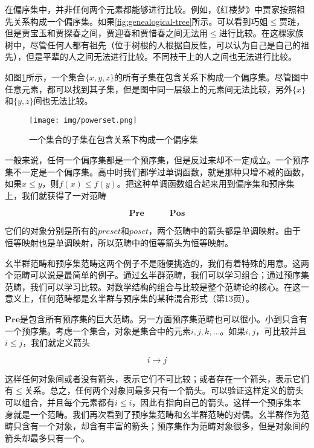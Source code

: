 \documentclass{article}
\begin{document}
在偏序集中，并非任何两个元素都能够进行比较。例如，《红楼梦》中贾家按照祖先关系构成一个偏序集。如果\ref{fig:genealogical-tree}所示。可以看到巧姐$\leq$贾琏，但是贾宝玉和贾探春之间，贾迎春和贾惜春之间无法用$\leq$进行比较。在这棵家族树中，尽管任何人都有祖先（位于树根的人根据自反性，可以认为自己是自己的祖先），但是平辈的人之间无法进行比较。不同枝干上的人之间也无法进行比较。

如图\ref{fig:powerset}所示，一个集合$\{x, y, z\}$的所有子集在包含关系下构成一个偏序集。尽管图中任意元素，都可以找到其子集，但是图中同一层级上的元素间无法比较，另外$\{x\}$和$\{y, z\}$间也无法比较。

\begin{figure}[htbp]
 \centering
 \texttt{[image: img/powerset.png]}
 \caption{一个集合的子集在包含关系下构成一个偏序集}
 \label{fig:powerset}
\end{figure}

 
一般来说，任何一个偏序集都是一个预序集，但是反过来却不一定成立。一个预序集不一定是一个偏序集。高中时我们都学过单调函数，就是那种只增不减的函数，如果$x \leq y$，则$f(x) \leq f(y)$。把这种单调函数组合起来用到偏序集和预序集上，我们就获得了一对范畴

\[
\pmb{Pre} \quad \quad \quad \pmb{Pos}
\]

它们的对象分别是所有的$preset$和$poset$，两个范畴中的箭头都是单调映射。由于恒等映射也是单调映射，所以范畴中的恒等箭头为恒等映射。

幺半群范畴和预序集范畴这两个例子不是随便挑选的，我们有着特殊的用意。这两个范畴可以说是最简单的例子。通过幺半群范畴，我们可以学习组合；通过预序集范畴，我们可以学习比较。对数学结构的组合与比较是整个范畴论的核心。在这一意义上，任何范畴都是幺半群与预序集的某种混合形式（\cite{Simmons2011}第13页）。

$\pmb{Pre}$是包含所有预序集的巨大范畴。另一方面预序集范畴也可以很小。小到只含有一个预序集。考虑一个集合，对象是集合中的元素$i, j, k, ...$。如果$i, j$，可比较并且$i \leq j$，我们就定义箭头

\[
i \longrightarrow j
\]

这样任何对象间或者没有箭头，表示它们不可比较；或者存在一个箭头，表示它们有$\leq$关系。总之，任何两个对象间最多只有一个箭头。可以验证这样定义的箭头可以组合，并且每个元素都有$i \leq i$，因此有指向自己的箭头。这样一个预序集本身就是一个范畴。我们再次看到了预序集范畴和幺半群范畴的对偶。幺半群作为范畴只含有一个对象，却含有丰富的箭头；预序集作为范畴对象很多，但是对象间的箭头却最多只有一个。
\end{document}
